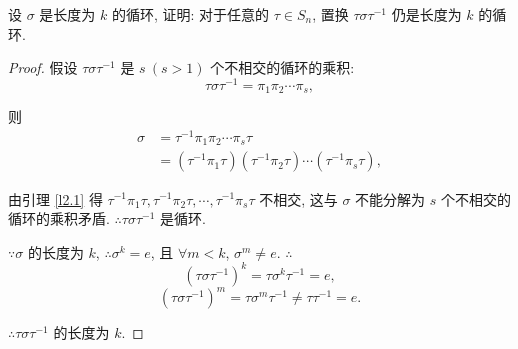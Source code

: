 \documentclass{ctexart}
\begin{document}
\begin{exercisec}[2.3.3]
    设 $\sigma$ 是长度为 $k$ 的循环, 证明: 对于任意的 $\tau\in S_n$, 置换 $\tau\sigma\tau^{-1}$ 仍是长度为 $k$ 的循环.
\end{exercisec}
\begin{proof}
    假设 $\tau\sigma\tau^{-1}$ 是 $s\ (s>1)$ 个不相交的循环的乘积:
    \[\tau\sigma\tau^{-1}=\pi_1\pi_2\cdots\pi_s,\]

    则
    \begin{align*}
        \sigma & =\tau^{-1}\pi_1\pi_2\cdots\pi_s\tau \\
        & =(\tau^{-1}\pi_1\tau)(\tau^{-1}\pi_2\tau)\cdots(\tau^{-1}\pi_s\tau),
    \end{align*}

    由引理 \ref{l2.1} 得 $\tau^{-1}\pi_1\tau,\tau^{-1}\pi_2\tau,\cdots,\tau^{-1}\pi_s\tau$ 不相交, 这与 $\sigma$ 不能分解为 $s$ 个不相交的循环的乘积矛盾. $\therefore\tau\sigma\tau^{-1}$ 是循环.

    $\because\sigma$ 的长度为 $k$, $\therefore\sigma^k=e$, 且 $\forall m<k$, $\sigma^m\neq e$. $\therefore$
    \[(\tau\sigma\tau^{-1})^k=\tau\sigma^k\tau^{-1}=e,\]
    \[(\tau\sigma\tau^{-1})^m=\tau\sigma^m\tau^{-1}\neq\tau\tau^{-1}=e.\]

    $\therefore\tau\sigma\tau^{-1}$ 的长度为 $k$.
\end{proof}
\end{document}
